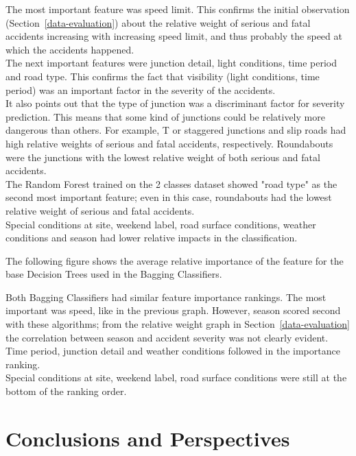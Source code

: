 \documentclass[11pt]{article}
\begin{document}
The most important feature was speed limit. This confirms the initial observation (Section~\ref{data-evaluation}) about the relative weight of serious and fatal accidents increasing with increasing speed limit, and thus probably the speed at which the accidents happened.\\
The next important features were junction detail, light conditions, time period and road type. This confirms the fact that visibility (light conditions, time period) was an important factor in the severity of the accidents.\\
It also points out that the type of junction was a discriminant factor for severity prediction. This means that some kind of junctions could be relatively more dangerous than others. For example, T or staggered junctions and slip roads had high relative weights of serious and fatal accidents, respectively. Roundabouts were the junctions with the lowest relative weight of both serious and fatal accidents.\\
The Random Forest trained on the 2 classes dataset showed "road type" as the second most important feature; even in this case, roundabouts had the lowest relative weight of  serious and fatal accidents.\\
Special conditions at site, weekend label, road surface conditions, weather conditions and season had lower relative impacts in the classification.

The following figure shows the average relative importance of the feature for the base Decision Trees used in the Bagging Classifiers.

    \begin{center}
    \end{center}
    
Both Bagging Classifiers had similar feature importance rankings. The most important was speed, like in the previous graph. However, season scored second with these algorithms; from the relative weight graph in Section~\ref{data-evaluation} the correlation between season and accident severity was not clearly evident.\\
Time period, junction detail and weather conditions followed in the importance ranking.\\
Special conditions at site, weekend label, road surface conditions were still at the bottom of the ranking order.

\section{Conclusions and Perspectives}
\end{document}
